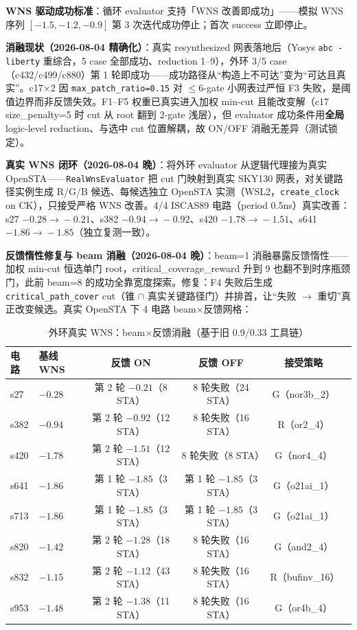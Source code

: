 \documentclass[journal]{IEEEtran}
\begin{document}
\textbf{WNS 驱动成功标准}：循环 evaluator 支持「WNS 改善即成功」——模拟 WNS 序列 $[-1.5, -1.2, -0.9]$ 第 3 次迭代成功停止；首次 success 立即停止。

\textbf{消融现状（2026-08-04 精确化）}：真实 resynthesized 网表落地后（Yosys \texttt{abc -liberty} 重综合，5 case 全部成功、reduction 1--9），外环 3/5 case（c432/c499/c880）第 1 轮即成功——成功路径从“构造上不可达”变为“可达且真实”。c17$\times$2 因 \texttt{max\_patch\_ratio=0.15} 对 $\leq 6$-gate 小网表过严恒 F3 失败，是阈值边界而非反馈失效。F1--F5 权重已真实进入加权 min-cut 且能改变解（c17 size\_penalty=5 时 cut 从 root 翻到 2-gate 浅层），但 evaluator 成功条件用\textbf{全局} logic-level reduction、与选中 cut 位置解耦，故 ON/OFF 消融无差异（测试锁定）。

\textbf{真实 WNS 闭环（2026-08-04 晚）}：将外环 evaluator 从逻辑代理接为真实 OpenSTA——\texttt{RealWnsEvaluator} 把 cut 门映射到真实 SKY130 网表，对关键路径实例生成 R/G/B 候选、每候选独立 OpenSTA 实测（WSL2，\texttt{create\_clock} on CK），只接受严格 WNS 改善。4/4 ISCAS89 电路（period 0.5ns）真实改善：s27 $-0.28\!\rightarrow\!-0.21$、s382 $-0.94\!\rightarrow\!-0.92$、s420 $-1.78\!\rightarrow\!-1.51$、s641 $-1.86\!\rightarrow\!-1.85$（独立复测一致）。

\textbf{反馈惰性修复与 beam 消融（2026-08-04 晚）}：beam=1 消融暴露反馈惰性——加权 min-cut 恒选单门 root，critical\_coverage\_reward 升到 9 也翻不到时序瓶颈门，此前 beam=8 的成功全靠宽度探索。修复：F4 失败后生成 \texttt{critical\_path\_cover} cut（锥 $\cap$ 真实关键路径门）并排首，让“失败 $\rightarrow$ 重切”真正改变候选。真实 OpenSTA 下 4 电路 beam$\times$反馈网格：

\begin{table}[!t]
\centering
\caption{外环真实 WNS：beam$\times$反馈消融（基于旧 0.9/0.33 工具链）}
\label{tab:beam_feedback}
\scriptsize
\setlength{\tabcolsep}{3pt}
\begin{tabular}{llcccc}
\toprule
\textbf{电路} & \textbf{基线 WNS} & \textbf{反馈 ON} & \textbf{反馈 OFF} & \textbf{接受策略} \\
\midrule
s27  & $-0.28$ & 第 2 轮 $-0.21$（8 STA） & 8 轮失败（24 STA） & G（nor3b\_2） \\
s382 & $-0.94$ & 第 2 轮 $-0.92$（12 STA） & 8 轮失败（16 STA） & R（or2\_4） \\
s420 & $-1.78$ & 第 2 轮 $-1.51$（12 STA） & 8 轮失败（8 STA） & G（nor4\_4） \\
s641 & $-1.86$ & 第 1 轮 $-1.85$（3 STA） & 第 1 轮 $-1.85$（3 STA） & G（o21ai\_1） \\
s713 & $-1.86$ & 第 1 轮 $-1.85$（3 STA） & 第 1 轮 $-1.85$（3 STA） & G（o21ai\_1） \\
s820 & $-1.42$ & 第 2 轮 $-1.28$（18 STA） & 8 轮失败（16 STA） & G（and2\_4） \\
s832 & $-1.15$ & 第 2 轮 $-1.12$（43 STA） & 8 轮失败（16 STA） & R（bufinv\_16） \\
s953 & $-1.48$ & 第 2 轮 $-1.38$（11 STA） & 8 轮失败（16 STA） & G（or4b\_4） \\
\bottomrule
\end{tabular}
\end{table}
\end{document}

